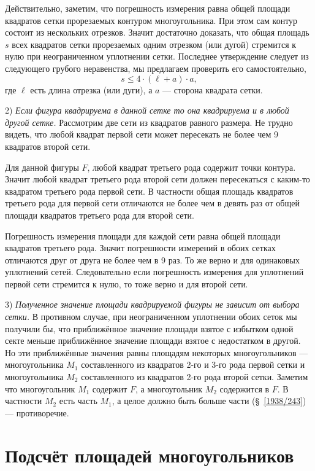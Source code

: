 \documentclass[oneside]{book}
\begin{document}
Действительно, заметим, что погрешность измерения равна общей площади квадратов сетки прорезаемых контуром многоугольника.
При этом сам контур состоит из нескольких отрезков.
Значит достаточно доказать, что общая площадь $s$ всех квадратов сетки прорезаемых одним отрезком (или дугой) стремится к нулю при неограниченном уплотнении сетки.
Последнее утверждение следует из следующего грубого неравенства, мы предлагаем проверить его самостоятельно,
\[s\le 4\cdot (\ell+a)\cdot a,\]
где $\ell$ есть длина отрезка (или дуги), а $a$ --- сторона квадрата сетки.

2) \emph{Если фигура квадрируема в данной сетке то она квадрируема и в любой другой сетке.}
Рассмотрим две сети из квадратов равного размера.
Не трудно видеть, что любой квадрат первой сети 
может пересекать не более чем 9 квадратов второй сети.

Для данной фигуры $F$, любой квадрат третьего рода содержит точки контура.
Значит любой квадрат третьего рода второй сети должен пересекаться с каким-то квадратом третьего рода первой сети.
В частности общая площадь квадратов третьего рода для первой сети  отличаются не более чем в девять раз от общей площади квадратов третьего рода для второй сети.

Погрешность измерения площади для каждой сети равна общей площади квадратов третьего рода.
Значит погрешности измерений в обоих сетках отличаются друг от друга не более чем в 9 раз.
То же верно и для одинаковых уплотнений сетей.
Следовательно если погрешность измерения для уплотнений первой сети стремится к нулю, то тоже верно и для второй сети. 

3) \emph{Полученное значение площади квадрируемой фигуры не зависит от выбора сетки.}
В противном случае, при неограниченном уплотнении обоих сеток мы получили бы, что
приближённое значение площади взятое с избытком одной секте меньше 
приближённое значение площади взятое с недостатком в другой.
Но эти приближённые значения равны площадям некоторых многоугольников --- многоугольника $M_1$ составленного из квадратов 2-го и 3-го рода первой сетки 
и многоугольника $M_2$ составленного из квадратов 2-го рода второй сетки.
Заметим что многоугольник $M_1$ содержит $F$, а многоугольник $M_2$ содержится в $F$.
В частности $M_2$ есть часть $M_1$, а целое должно быть больше части (§~\ref{1938/243}) --- противоречие.






\section{Подсчёт площадей многоугольников}
\end{document}
